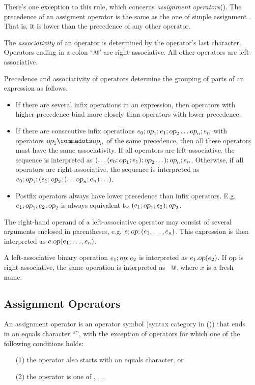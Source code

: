 There's one exception to this rule, which concerns
{\em assignment operators}().
The precedence of an assigment operator is the same as the one
of simple assignment \code{(=)}. That is, it is lower than the
precedence of any other operator. 

The {\em associativity} of an operator is determined by the operator's
last character.  Operators ending in a colon `\lstinline@:@' are
right-associative. All other operators are left-associative.

Precedence and associativity of operators determine the grouping of
parts of an expression as follows.
\begin{itemize}
\item If there are several infix operations in an
expression, then operators with higher precedence bind more closely
than operators with lower precedence.
\item If there are consecutive infix
operations $e_0; \mbox{\sl op}_1; e_1; \mbox{\sl op}_2 \ldots \mbox{\sl op}_n; e_n$ 
with operators $\op_1 \commadots \op_n$ of the same precedence, 
then all these operators must
have the same associativity. If all operators are left-associative,
the sequence is interpreted as
$(\ldots(e_0;\mbox{\sl op}_1;e_1);\mbox{\sl op}_2\ldots);\mbox{\sl op}_n;e_n$. 
Otherwise, if all operators are right-associative, the
sequence is interpreted as
$e_0;\mbox{\sl op}_1;(e_1;\mbox{\sl op}_2;(\ldots \mbox{\sl op}_n;e_n)\ldots)$.
\item
Postfix operators always have lower precedence than infix
operators. E.g.\ $e_1;\mbox{\sl op}_1;e_2;\mbox{\sl op}_2$ is always equivalent to
$(e_1;\mbox{\sl op}_1;e_2);\mbox{\sl op}_2$.
\end{itemize}
The right-hand operand of a left-associative operator may consist of
several arguments enclosed in parentheses, e.g. $e;\mbox{\sl op};(e_1,\ldots,e_n)$.
This expression is then interpreted as $e.\mbox{\sl op}(e_1,\ldots,e_n)$.

A left-associative binary
operation $e_1;\mbox{\sl op};e_2$ is interpreted as $e_1.\mbox{\sl op}(e_2)$. If $\mbox{\sl op}$ is
right-associative, the same operation is interpreted as
~@, where $x$ is a fresh
name. 

\subsection{Assignment Operators} \label{sec:assops}

An assignment operator is an operator symbol (syntax category
\lstinline@op@ in ()) that ends in an equals character
``\code{=}'', with the exception of operators for which one of 
the following conditions holds:
\begin{itemize}
\item[(1)] the operator also starts with an equals character, or
\item[(2)] the operator is one of \code{(<=)}, \code{(>=)},
  \code{(!=)}.
\end{itemize}

